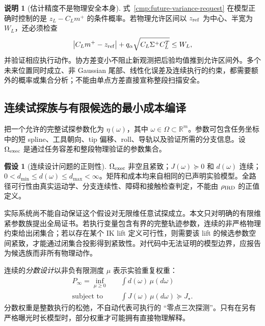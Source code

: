 \documentclass[11pt,a4paper]{article}
\numberwithin{equation}{section}
\theoremstyle{definition}
\newtheorem{assumption}[theorem]{假设}
\newtheorem{remark}[theorem]{说明}
\newcommand{\R}{\mathbb R}
\newcommand{\abs}[1]{\left\lvert#1\right\rvert}
\begin{document}
\begin{remark}[估计精度不是物理安全本身]
\label{cmp:variance-not-safety}
式~\eqref{cmp:future-variance-request} 在模型正确时控制的是
$z_L-C_Lm^+$ 的条件概率。若物理允许区间以 $z_{\rm ref}$ 为中心、半宽为 $W_L$，还必须检查
\begin{equation}
 \abs{C_Lm^+-z_{\rm ref}}+
 q_\alpha\sqrt{C_L\Sigma^+C_L^T}\le W_L,
\end{equation}
并验证相应执行动作。协方差变小不阻止新观测把后验均值推到允许区间外。多个未来位置同时成立、非 Gaussian 尾部、线性化误差及连续执行的约束，都需要额外的概率或集合分析；不能由单点方差直接宣称整段扫描安全。
\end{remark}

\subsection{连续试探族与有限候选的最小成本编译}
\label{cmp:optimization}

把一个允许的完整试探参数化为 $\eta(\omega)$，其中 $\omega\in\Omega\subset\R^m$。参数可包含任务坐标中的短 spline、工具朝向、tip 偏移、roll、导轨以及验证所需的分支信息。设 $\Omega_{\rm exec}$ 是通过任务容差和整段物理验证的参数集合。

\begin{assumption}[连续设计问题的正则性]
\label{cmp:compact}
$\Omega_{\rm exec}$ 非空且紧致；$J(\omega)\succeq0$ 和 $d(\omega)$ 连续；$0<d_{\min}\le d(\omega)\le d_{\max}<\infty$。矩阵和成本均来自相同的已声明实验模型。全路径可行性由真实运动学、分支连续性、障碍和接触检查判定，不能由 $\rho_{\rm IRD}$ 的正值定义。
\end{assumption}

实际系统尚不能自动保证这个假设对无限维任意试探成立。本文只对明确的有限维紧参数族提出全局证书。若执行变量包含有界的完整轨迹参数，连续的非严格物理约束给出闭集合；若以存在某个 IK lift 定义可行性，则需要该 lift 的候选参数空间紧致，才能通过闭集合投影得到紧致性。对代码中无法证明的模型边界，应报告为候选族而非所有物理动作。

连续的\emph{分数设计}以非负有限测度 $\mu$ 表示实验重复权重：
\begin{align}
 P_\infty=\inf_{\mu\ge0}\quad &\int d(\omega)\,\mu(d\omega)\\
 \text{subject to}\quad &\int J(\omega)\,\mu(d\omega)\succeq J_\star.
 \label{cmp:continuous-primal}
\end{align}
分数权重是整数执行的松弛，不自动代表可执行的 ``零点三次探测''。只有在另有严格曝光时长模型时，部分权重才可能拥有直接物理解释。
\end{document}
